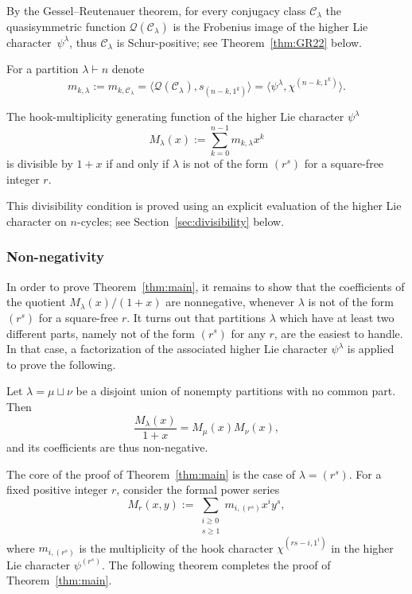 \documentclass[ALCO,published]{cedram}
\newcommand{\Q}{\mathcal Q}
\newcommand{\C}{\mathcal C}
\begin{document}
By the 
Gessel--Reutenauer theorem, 
for every conjugacy class $\C_\lambda$ 
the quasisymmetric function 
$\Q(\C_\lambda)$ is the Frobenius image of the higher Lie character~$\psi^\lambda$, thus  $\C_\lambda$ is  Schur-positive; 
see Theorem~\ref{thm:GR22} below.

For a partition $\lambda \vdash n$ denote
\begin{equation}\label{notation:m_k_hLc}
m_{k,\lambda} := m_{k,\C_\lambda}
= \langle \Q(\C_\lambda), s_{(n-k,1^k)} \rangle
= \langle \psi^\lambda, \chi^{(n-k,1^k)} \rangle.
\end{equation}
    
\begin{proposition}\label{prop:divisibility} 
    The hook-multiplicity generating function of the higher Lie character $\psi^\lambda$
    \[
        M_\lambda(x):=\sum\limits_{k=0}^{n-1}m_{k,\lambda}x^k
    \]
    is divisible by $1+x$ 
    if and only if $\lambda$ is not of the form $(r^s)$ for a square-free integer $r$.
\end{proposition}

This divisibility condition is proved using an explicit evaluation of the higher Lie character on $n$-cycles; see Section~\ref{sec:divisibility} below.

    
\subsubsection{Non-negativity} 

In order to prove Theorem~\ref{thm:main}, it remains to show that the coefficients of the quotient  $M_\lambda(x)/(1+x)$ are nonnegative, whenever $\lambda$ is not of the form $(r^s)$ for a square-free $r$. 
It turns out that partitions $\lambda$ which have at least two different parts, namely not of the form $(r^s)$ for any $r$, are the easiest to handle. 
In that case, a factorization of the associated higher Lie character $\psi^\lambda$ is applied to prove the following. 

\begin{lemma}\label{lem:distinct}
    Let $\lambda = \mu \sqcup \nu$ be a disjoint union of nonempty partitions with no common part. 
    Then
    \begin{equation}
        \frac{M_\lambda(x)}{1+x} = M_\mu(x) M_\nu(x),     
    \end{equation}
    and its coefficients are thus non-negative.
\end{lemma}	

The core of the proof of Theorem~\ref{thm:main} is 
the case of $\lambda = (r^s)$.
For a fixed positive integer $r$, consider the formal power series
\[
    M_r(x,y) := \sum_{\substack{i \ge 0 \\ s \ge 1}} m_{i,(r^s)} x^i y^s,
\]
where $m_{i,(r^s)}$ is the multiplicity of the hook character $\chi^{(rs-i,1^i)}$ in the higher Lie character $\psi^{(r^s)}$. 
The following theorem completes the proof of Theorem~\ref{thm:main}.
 
\end{document}
